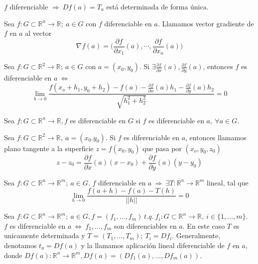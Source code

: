 \begin{obs}
$f$ diferenciable $\Rightarrow \ Df(a) = T_a$ está determinada de forma única.
\end{obs}

\begin{defn}
Sea $f:G\subset \mathbb{R}^n \rightarrow \mathbb{R}; \ a\in G$ con $f$ diferenciable en $a$. Llamamos vector gradiente de $f$ en $a$ al vector \[ \nabla f(a) = \bigg(\frac{\partial f}{\partial x_1}(a),\cdots,\frac{\partial f}{\partial x_n}(a)\bigg) \]
\end{defn}

\begin{cor}
Sea $f:G\subset \mathbb{R}^2 \rightarrow \mathbb{R}; \ a\in G$ con $a = (x_0,y_0)$. Si $\exists \frac{\partial f}{\partial x}(a),\frac{\partial f}{\partial y}(a)$, entonces $f$ es diferenciable en $a \ \Leftrightarrow$ \[ \lim_{h\rightarrow 0} \frac{f(x_o + h_1, y_0 + h_2) - f(a) - \frac{\partial f}{\partial x}(a)h_1 - \frac{\partial f}{\partial y}(a)h_2}{\sqrt{h_1^2 + h_2^2}} = 0 \]
\end{cor}

\begin{defn}
Sea $f:G\subset \mathbb{R}^n \rightarrow \mathbb{R}, f$ es diferenciable en $G$ si $f$ es diferenciable en $a, \ \forall a \in G$.
\end{defn}

\begin{defn}
Sea $f:G\subset \mathbb{R}^2 \rightarrow \mathbb{R}, \ a = (x_0.y_0)$. Si $f$ es diferenciable en $a$, entonces llamamos plano tangente a la superficie $z = f(x_0,y_0)$ que pasa por $(x_o,y_0,z_0)$ \[ z-z_0 = \frac{\partial f}{\partial x}(a)(x - x_0) +  \frac{\partial f}{\partial y}(a)(y - y_0)  \]
\end{defn}

\begin{defn}
Sea $f:G\subset \mathbb{R}^n \rightarrow \mathbb{R}^m; \ a\in G$. $f$ diferenciable en $a \ \Rightarrow \ \exists T:\mathbb{R}^n \rightarrow \mathbb{R}^m $ lineal, tal que \[ \lim_{h\rightarrow 0} \frac{f(a+h) - f(a) - T(h)}{||h||} = 0 \] 
\end{defn}

\begin{prop}
Sea $f:G\subset \mathbb{R}^n \rightarrow \mathbb{R}^m; \ a\in G, f = (f_1,...,f_m) \ t.q. \ f_i:G\subset\mathbb{R}^n \rightarrow \mathbb{R},\ i \in\{1,...,m\}$. \\ $f$ es diferenciable en $a \ \Leftrightarrow \ f_1,...,f_m$ son diferenciables en $a$. En este caso $T$ es unicamente determinada y $T=(T_1,...,T_m); \ T_i = Df_i$. Generalmente, denotamos $ t_a = Df(a)$ y la llamamos aplicación lineal diferenciable de $f$ en $a$, donde $Df(a): \mathbb{R}^n \rightarrow \mathbb{R}^m, Df(a) = (Df_1(a),...,Df_m(a))$.
\end{prop}

